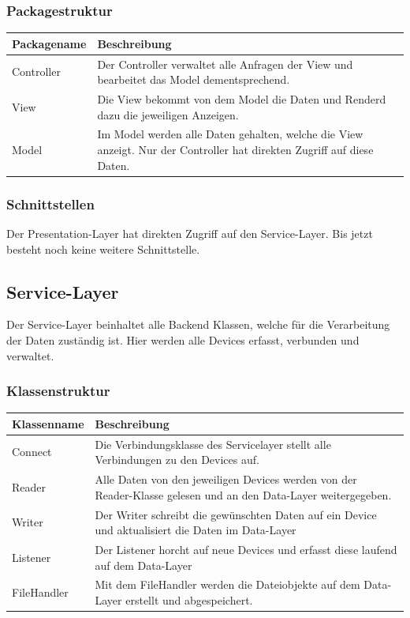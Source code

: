 \subsubsection{Packagestruktur}
\begin{table}[H]
\centering
    \begin{tabular}{@{}l p{14.1cm} @{}}\toprule    
    {Packagename} & {Beschreibung}\\ \midrule
    Controller & Der Controller verwaltet alle Anfragen der View und bearbeitet das Model dementsprechend.\\       
    View & Die View bekommt von dem Model die Daten und Renderd dazu die jeweiligen Anzeigen. \\
    Model & Im Model werden alle Daten gehalten, welche die View anzeigt. Nur der Controller hat direkten Zugriff auf diese Daten.
    \bottomrule
    \end{tabular}
\end{table}
\subsubsection{Schnittstellen}
Der Presentation-Layer hat direkten Zugriff auf den Service-Layer. Bis jetzt besteht noch keine weitere Schnittstelle.


\subsection{Service-Layer}
Der Service-Layer beinhaltet alle Backend Klassen, welche für die Verarbeitung der Daten zuständig ist. Hier werden alle Devices erfasst, verbunden und verwaltet.
\subsubsection{Klassenstruktur}
\begin{table}[H]
\centering
    \begin{tabular}{@{}l p{11cm} @{}}\toprule    
    {Klassenname} & {Beschreibung}\\ \midrule
    Connect & Die Verbindungsklasse des Servicelayer stellt alle Verbindungen zu den Devices auf.  \\       
     Reader & Alle Daten von den jeweiligen Devices werden von der Reader-Klasse gelesen und an den Data-Layer weitergegeben.  \\       
     Writer &  Der Writer schreibt die gewünschten Daten auf ein Device und aktualisiert die Daten im Data-Layer \\       
     Listener &  Der Listener horcht auf neue Devices und erfasst diese laufend auf dem Data-Layer \\       
     FileHandler &  Mit dem FileHandler werden die Dateiobjekte auf dem Data-Layer erstellt und abgespeichert. \\       
    \bottomrule
    \end{tabular}
\end{table}
